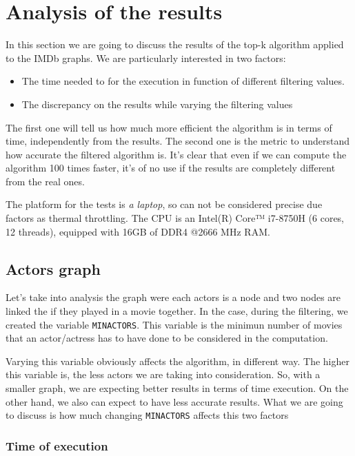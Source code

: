 \section{Analysis of the results}
In this section we are going to discuss the results of the top-k algorithm applied to the IMDb graphs. We are particularly interested in two factors:
\begin{itemize}
    \item The time needed to for the execution in function of different filtering values.
    \item The discrepancy on the results while varying the filtering values
\end{itemize}
The first one will tell us how much more efficient the algorithm is in terms of time, independently from the results. The second one is the metric to understand how accurate the filtered algorithm is. It's clear that even if we can compute the algorithm 100 times faster, it's of no use if the results are completely different from the real ones.\s

\nd The platform for the tests is \emph{a laptop}, so can not be considered precise due factors as thermal throttling. The CPU is an Intel(R) Core™ i7-8750H (6 cores, 12 threads), equipped with 16GB of DDR4 @2666 MHz RAM.

\subsection{Actors graph}
Let's take into analysis the graph were each actors is a node and two nodes are linked the if they played in a movie together. In the case, during the filtering, we created the variable \texttt{MIN\textunderscore ACTORS}. This variable is the minimun number of movies that an actor/actress has to have done to be considered in the computation.

Varying this variable obviously affects the algorithm, in different way. The higher this variable is, the less actors we are taking into consideration. So, with a smaller graph, we are expecting better results in terms of time execution. On the other hand, we also can expect to have less accurate results. What we are going to discuss is how much changing \texttt{MIN\textunderscore ACTORS} affects this two factors

\subsubsection{Time of execution}

